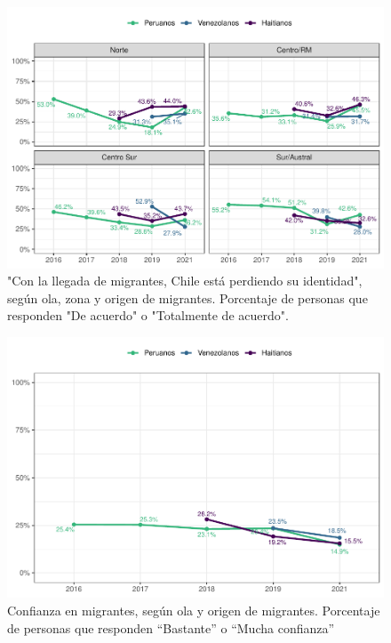 \documentclass[
  12pt,
]{book}
\begin{document}
\begin{figure}

{\centering \includegraphics{reporte-elsoc_files/figure-latex/amen2-zona-1} 

}

\caption{"Con la llegada de migrantes, Chile está perdiendo su identidad", según ola, zona y origen de migrantes. Porcentaje de personas que responden "De acuerdo" o "Totalmente de acuerdo".}\label{fig:amen2-zona}
\end{figure}

\begin{figure}

{\centering \includegraphics{reporte-elsoc_files/figure-latex/conf-wave-1} 

}

\caption{Confianza en migrantes, según ola y origen de migrantes. Porcentaje de personas que responden “Bastante” o “Mucha confianza”}\label{fig:conf-wave}
\end{figure}
\end{document}

